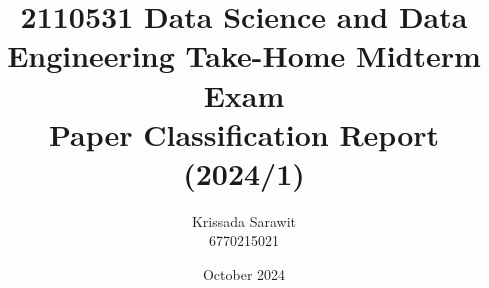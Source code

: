 \documentclass[a4paper,12pt]{extreport}
\title{2110531 Data Science and Data Engineering Take-Home Midterm Exam\\Paper Classification Report (2024/1)}
\author{Krissada Sarawit\\6770215021}
\date{October 2024}
\begin{document}
\maketitle
\clearpage

\tableofcontents







\renewcommand{\bibname}{References}
  
 
\end{document}
